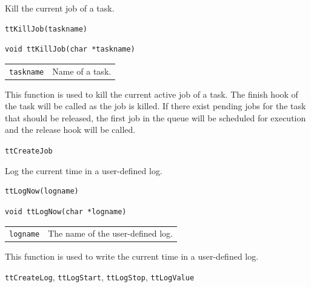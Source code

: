 \documentclass[final,twoside]{rapport}
\begin{document}


\purpose
Kill the current job of a task.

\Msyntax
\begin{verbatim}
ttKillJob(taskname)
\end{verbatim}

\Csyntax
\begin{verbatim}
void ttKillJob(char *taskname)
\end{verbatim}

\args
\begin{tabularx}{\hsize}{l>{\raggedright\arraybackslash}X}
  {\tt taskname} & Name of a task. \\
\end{tabularx}

\descr This function is used to kill the current active job of a task.
The finish hook of the task will be called as the job is killed. If
there exist pending jobs for the task that should be released, the
first job in the queue will be scheduled for execution and the release
hook will be called.

\seealso
{\tt ttCreateJob}



\purpose
Log the current time in a user-defined log.

\Msyntax
\begin{verbatim}
ttLogNow(logname)
\end{verbatim}

\Csyntax
\begin{verbatim}
void ttLogNow(char *logname) 
\end{verbatim}

\args
\begin{tabularx}{\hsize}{l>{\raggedright\arraybackslash}X}
  {\tt logname} & The name of the user-defined log. \\
\end{tabularx}

\descr This function is used to write the current time in a user-defined
log.

\seealso
{\tt ttCreateLog}, {\tt ttLogStart}, {\tt ttLogStop}, {\tt ttLogValue}   


\end{document}
